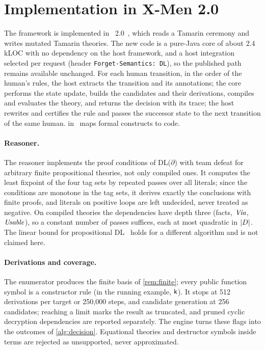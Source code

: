 \section{Implementation in X-Men 2.0}
\label{sec:implementation}

The framework is implemented in \XMen~2.0~\SCP, which reads a Tamarin ceremony and writes mutated Tamarin theories. The new code is a pure-Java core of about 2.4\,kLOC with no dependency on the host framework, and a host integration selected per request (header \texttt{Forget-Semantics: DL}), so the published \forget{} path remains available unchanged. For each human transition, in the order of the human's rules, the host extracts the transition and its annotations; the core performs the state update, builds the candidates and their derivations, compiles and evaluates the theory, and returns the decision with its trace; the host rewrites and certifies the rule and passes the successor state to the next transition of the same human.  in~ maps formal constructs to code.

\paragraph{Reasoner.} The reasoner implements the proof conditions of DL($\partial$) with team defeat for arbitrary finite propositional theories, not only compiled ones. It computes the least fixpoint of the four tag sets by repeated passes over all literals; since the conditions are monotone in the tag sets, it derives exactly the conclusions with finite proofs, and literals on positive loops are left undecided, never treated as negative. On compiled theories the dependencies have depth three (facts, $\mathit{Via}$, $\mathit{Usable}$), so a constant number of passes suffices, each at most quadratic in $|D|$. The linear bound for propositional DL~\cite{maher2001propositional} holds for a different algorithm and is not claimed here.

\paragraph{Derivations and coverage.} The enumerator produces the finite basis of \cref{rem:finite}; every public function symbol is a constructor rule (in the running example, $\mathsf{k}$). It stops at 512 derivations per target or 250{,}000 steps, and candidate generation at 256 candidates; reaching a limit marks the result as truncated, and pruned cyclic decryption dependencies are reported separately. The engine turns these flags into the outcomes of \cref{alg:decision}. Equational theories and destructor symbols inside terms are rejected as unsupported, never approximated.

